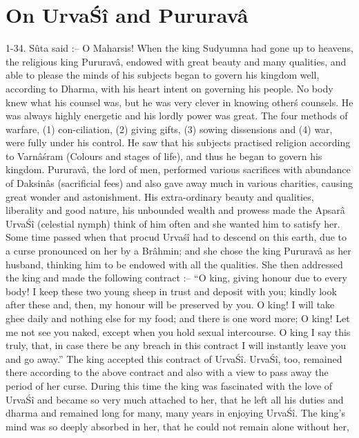 \chapter{On Urva\'S\^i and Pururav\^a}

1-34. S\^uta said :-- O Maharsis! When the king Sudyumna had gone up to heavens, the religious king Pururav\^a, endowed with great beauty and many qualities, and able to please the minds of his subjects began to govern his kingdom well, according to Dharma, with his heart intent on governing his people. No body knew what his counsel was, but he was very clever in knowing other\'s counsels. He was always highly energetic and his lordly power was great. The four methods of warfare, (1) con-ciliation, (2) giving gifts, (3) sowing dissensions and (4) war, were fully under his control. He saw that his subjects practised religion according to Varn\^a\'sram (Colours and stages of life), and thus he began to govern his kingdom. Pururav\^a, the lord of men, performed various sacrifices with abundance of Daksin\^as (sacrificial fees) and also gave away much in various charities, causing great wonder and astonishment. His extra-ordinary beauty and qualities, liberality and good nature, his unbounded wealth and prowess made the Apsar\^a Urva\'S\^i (celestial nymph) think of him often and she wanted him to satisfy her. Some time passed when that procud Urva\'s\^i had to descend on this earth, due to a curse pronounced on her by a Br\^ahmin; and she chose the king Pururav\^a as her husband, thinking him to be endowed with all the qualities. She then addressed the king and made the following contract :-- ``O king, giving honour due to every body! I keep these two young sheep in trust and deposit with you; kindly look after these and, then, my honour will be preserved by you. O king! I will take ghee daily and nothing else for my food; and there is one word more; O king! Let me not see you naked, except when you hold sexual intercourse. O king I say this truly, that, in case there be any breach in this contract I will instantly leave you and go away.'' The king accepted this contract of Urva\'S\^i. Urva\'S\^i, too, remained there according to the above contract and also with a view to pass away the period of her curse. During this time the king was fascinated with the love of Urva\'S\^i and became so very much attached to her, that he left all his duties and dharma and remained long for many, many years in enjoying Urva\'S\^i. The king's mind was so deeply absorbed in her, that he could not remain alone without her,

